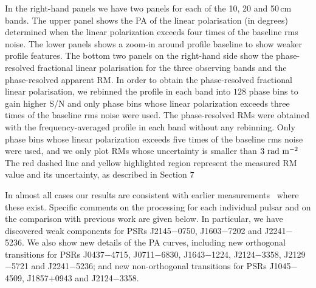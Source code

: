 \documentclass[useAMS,usenatbib]{mn2e}
\begin{document}
In the right-hand panels we have two panels for each of the 10, 20 and 50\,cm bands. The upper 
panel shows the PA of the linear polarisation (in degrees) determined when the 
linear polarization exceeds four times of the baseline rms noise.  
%
The lower panels shows a zoom-in around profile baseline to show weaker profile features. 
%
The bottom two panels on the right-hand side show the phase-resolved fractional linear polarisation 
for the three observing bands and the phase-resolved apparent RM.
%
In order to obtain the phase-resolved fractional linear polarisation, we rebinned the profile 
in each band into $128$ phase bins to gain higher S/N and only phase bins whose linear polarization 
exceeds three times of the baseline rms noise were used. 
%
The phase-resolved RMs were obtained with the frequency-averaged profile in each band 
without any rebinning. Only phase bins whose linear polarization exceeds five times of the 
baseline rms noise were used, and we only plot RMs whose uncertainty is smaller than 
$3\ \rm{rad\ m^{-2}}$
%
The red dashed line and yellow highlighted region represent the measured RM value and its 
uncertainty, as described in Section $7$

In almost all cases our results are consistent with earlier measurements~\citep[such as][]{Ord04,Yan11}
where these exist.
%
Specific comments on the processing for each individual pulsar and on the comparison with 
previous work are given below.   
%
In particular, we have discovered weak components for PSRs J2145$-$0750, J1603$-$7202 and 
J2241$-$5236. We also show new details of the PA curves, including new orthogonal 
transitions for PSRs J0437$-$4715, J0711$-$6830, J1643$-$1224, J2124$-$3358, 
J2129$-$5721 and J2241$-$5236; and new non-orthogonal transitions for PSRs J1045$-$4509, 
J1857$+$0943 and J2124$-$3358.

%
%
%
%
\end{document}

